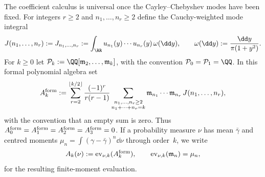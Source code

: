 The coefficient calculus is universal once the Cayley--Chebyshev modes have
been fixed.  For integers $r\ge2$ and $n_1,\dots,n_r\ge2$ define the
Cauchy-weighted mode integral
\begin{equation}\label{eq:mode-integral-definition}
J(n_1,\dots,n_r):=J_{n_1,\dots,n_r}:=
\int_{\RR}u_{n_1}(y)\cdots u_{n_r}(y)\,\omega(\dd y),
\qquad
\omega(\dd y):=\frac{\dd y}{\pi(1+y^2)}.
\end{equation}
For $k\ge0$ let
$\mathcal P_k:=\QQ[\mathfrak m_2,\ldots,\mathfrak m_k]$, with the convention
$\mathcal P_0=\mathcal P_1=\QQ$.  In this formal polynomial algebra set
\begin{equation}\label{eq:universal-entropy-coefficient}
A_k^{\rm form}:=
\sum_{r=2}^{\lfloor k/2\rfloor}
\frac{(-1)^r}{r(r-1)}
\sum_{\substack{n_1,\dots,n_r\ge2\\ n_1+\cdots+n_r=k}}
\mathfrak m_{n_1}\cdots\mathfrak m_{n_r}\,J(n_1,\dots,n_r),
\end{equation}
with the convention that an empty sum is zero.  Thus
$A_0^{\rm form}=A_1^{\rm form}=A_2^{\rm form}=A_3^{\rm form}=0$.  If a
probability measure $\nu$ has mean $\bar{\gamma}$ and centred moments
$\mu_n=\int(\gamma-\bar{\gamma})^n\dd\nu$ through order~$k$, we write
\begin{equation}\label{eq:universal-entropy-coefficient-evaluation}
A_k(\nu):={\rm ev}_{\nu,k}(A_k^{\rm form}),
\qquad
{\rm ev}_{\nu,k}(\mathfrak m_n)=\mu_n,
\end{equation}
for the resulting finite-moment evaluation.

